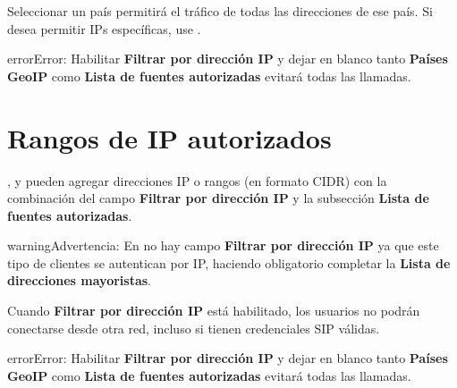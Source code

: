 \documentclass[letterpaper,10pt,spanish]{sphinxmanual}
\begin{document}
Seleccionar un país permitirá el tráfico de todas las direcciones de ese país. Si desea permitir IPs específicas, use {\hyperref[security_and_maintenance/security/authorized_ip_ranges:client\string-authorized\string-ip\string-ranges]{}}.

\begin{notice}{error}{Error:}
Habilitar \textbf{Filtrar por dirección IP} y dejar en blanco tanto \textbf{Países GeoIP} como \textbf{Lista de fuentes autorizadas} evitará todas las llamadas.
\end{notice}
\label{security_and_maintenance/security/authorized_ip_ranges:client-authorized-ip-ranges}

\section{Rangos de IP autorizados}
\label{security_and_maintenance/security/authorized_ip_ranges:client-authorized-ip-ranges}\label{security_and_maintenance/security/authorized_ip_ranges::doc}\label{security_and_maintenance/security/authorized_ip_ranges:authorized-ip-ranges}\label{security_and_maintenance/security/authorized_ip_ranges:id1}
{\hyperref[administration_portal/client/vpbx/index:vpbx\string-clients]{}}, {\hyperref[administration_portal/client/retail/index:retail\string-clients]{}} y {\hyperref[administration_portal/client/residential/index:residential\string-clients]{}} pueden agregar direcciones IP o rangos (en formato CIDR) con la combinación del campo \textbf{Filtrar por dirección IP} y la subsección \textbf{Lista de fuentes autorizadas}.

\begin{notice}{warning}{Advertencia:}
En {\hyperref[administration_portal/client/wholesale/index:wholesale\string-clients]{}} no hay campo \textbf{Filtrar por dirección IP} ya que este tipo de clientes se autentican por IP, haciendo obligatorio completar la \textbf{Lista de direcciones mayoristas}.
\end{notice}

Cuando \textbf{Filtrar por dirección IP} está habilitado, los usuarios no podrán conectarse desde otra red, incluso si tienen credenciales SIP válidas.

\begin{notice}{error}{Error:}
Habilitar \textbf{Filtrar por dirección IP} y dejar en blanco tanto \textbf{Países GeoIP} como \textbf{Lista de fuentes autorizadas} evitará todas las llamadas.
\end{notice}
\end{document}
